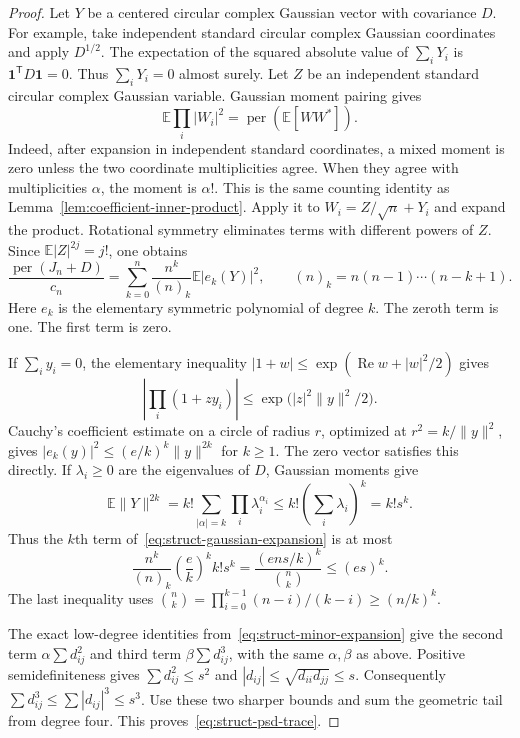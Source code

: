 \documentclass[11pt,a4paper]{article}
\theoremstyle{definition}
\theoremstyle{remark}
\newcommand{\per}{\operatorname{per}}
\newcommand{\T}{\mathsf{T}}
\begin{document}
\begin{proof}
Let $Y$ be a centered circular complex Gaussian vector with covariance $D$.
For example, take independent standard circular complex Gaussian coordinates and apply $D^{1/2}$.
The expectation of the squared absolute value of $\sum_iY_i$ is $\mathbf1^\T D\mathbf1=0$.
Thus $\sum_iY_i=0$ almost surely.
Let $Z$ be an independent standard circular complex Gaussian variable.
Gaussian moment pairing gives
\[
 \mathbb E\prod_i|W_i|^2=\per(\mathbb E[WW^*]).
\]
Indeed, after expansion in independent standard coordinates, a mixed moment is zero unless the two coordinate multiplicities agree.
When they agree with multiplicities $\alpha$, the moment is $\alpha!$.
This is the same counting identity as Lemma~\ref{lem:coefficient-inner-product}.
Apply it to $W_i=Z/\sqrt n+Y_i$ and expand the product.
Rotational symmetry eliminates terms with different powers of $Z$.
Since $\mathbb E|Z|^{2j}=j!$, one obtains
\begin{equation}\label{eq:struct-gaussian-expansion}
 \frac{\per(J_n+D)}{c_n}
 =\sum_{k=0}^n\frac{n^k}{(n)_k}\mathbb E|e_k(Y)|^2,
 \qquad (n)_k=n(n-1)\cdots(n-k+1).
\end{equation}
Here $e_k$ is the elementary symmetric polynomial of degree $k$.
The zeroth term is one. The first term is zero.

If $\sum_i y_i=0$, the elementary inequality
$|1+w|\le\exp(\operatorname{Re}w+|w|^2/2)$ gives
\[
 \left|\prod_i(1+zy_i)\right|
 \le\exp\bigl(|z|^2\|y\|^2/2\bigr).
\]
Cauchy's coefficient estimate on a circle of radius $r$, optimized at
$r^2=k/\|y\|^2$, gives
$|e_k(y)|^2\le(e/k)^k\|y\|^{2k}$ for $k\ge1$.
The zero vector satisfies this directly.
If $\lambda_i\ge0$ are the eigenvalues of $D$, Gaussian moments give
\[
 \mathbb E\|Y\|^{2k}
 =k!\sum_{|\alpha|=k}\prod_i\lambda_i^{\alpha_i}
 \le k!\left(\sum_i\lambda_i\right)^k=k!s^k.
\]
Thus the $k$th term of~\eqref{eq:struct-gaussian-expansion} is at most
\[
 \frac{n^k}{(n)_k}\left(\frac ek\right)^k k!s^k
 =\frac{(ens/k)^k}{\binom nk}\le(es)^k.
\]
The last inequality uses
$\binom nk=\prod_{i=0}^{k-1}(n-i)/(k-i)\ge(n/k)^k$.

The exact low-degree identities from~\eqref{eq:struct-minor-expansion} give the second term
$\alpha\sum d_{ij}^2$ and third term $\beta\sum d_{ij}^3$, with the same $\alpha,\beta$ as above.
Positive semidefiniteness gives
$\sum d_{ij}^2\le s^2$ and
$|d_{ij}|\le\sqrt{d_{ii}d_{jj}}\le s$.
Consequently $\sum d_{ij}^3\le\sum|d_{ij}|^3\le s^3$.
Use these two sharper bounds and sum the geometric tail from degree four.
This proves~\eqref{eq:struct-psd-trace}.
\end{proof}
\end{document}
